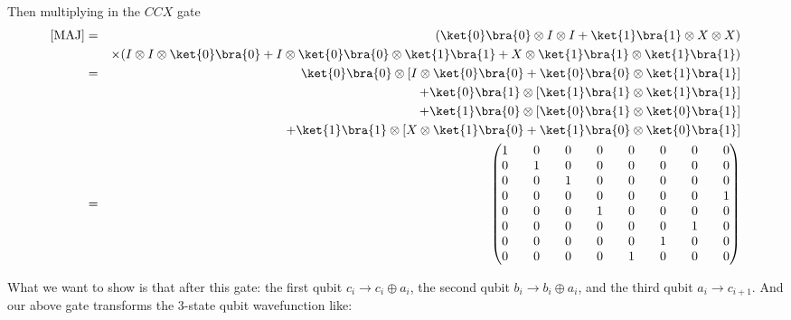 \documentclass[preprint,aps,prd,nofootinbib,superscriptaddress]{revtex4-2}
\begin{document}
Then multiplying in the $CCX$ gate
\begin{eqnarray}
\text{[MAJ]} &=& (\ket{0}\bra{0} \otimes I \otimes I + \ket{1}\bra{1} \otimes X \otimes X)
\nonumber \\
&& \times(I \otimes I \otimes \ket{0}\bra{0} + I \otimes \ket{0}\bra{0} \otimes \ket{1}\bra{1} + X \otimes \ket{1}\bra{1} \otimes \ket{1}\bra{1})
\nonumber \\
&=& \ket{0}\bra{0} \otimes \left[I \otimes \ket{0}\bra{0} + \ket{0}\bra{0} \otimes \ket{1}\bra{1}\right] 
\nonumber \\
&& + \ket{0}\bra{1} \otimes \left[\ket{1}\bra{1} \otimes \ket{1}\bra{1}\right]
\nonumber \\
&& + \ket{1}\bra{0} \otimes \left[\ket{0}\bra{1} \otimes \ket{0}\bra{1}\right]
\nonumber \\
&& + \ket{1}\bra{1} \otimes \left[X \otimes \ket{1}\bra{0} + \ket{1}\bra{0} \otimes \ket{0}\bra{1}\right]
\nonumber \\
&=& 
\begin{pmatrix}
1 \quad & 0 \quad & 0 \quad & 0 \quad & 0 \quad & 0 \quad & 0 \quad & 0 \\
0 \quad & 1 \quad & 0 \quad & 0 \quad & 0 \quad & 0 \quad & 0 \quad & 0 \\
0 \quad & 0 \quad & 1 \quad & 0 \quad & 0 \quad & 0 \quad & 0 \quad & 0 \\
0 \quad & 0 \quad & 0 \quad & 0 \quad & 0 \quad & 0 \quad & 0 \quad & 1 \\
0 \quad & 0 \quad & 0 \quad & 1 \quad & 0 \quad & 0 \quad & 0 \quad & 0 \\
0 \quad & 0 \quad & 0 \quad & 0 \quad & 0 \quad & 0 \quad & 1 \quad & 0 \\
0 \quad & 0 \quad & 0 \quad & 0 \quad & 0 \quad & 1 \quad & 0 \quad & 0 \\
0 \quad & 0 \quad & 0 \quad & 0 \quad & 1 \quad & 0 \quad & 0 \quad & 0
\end{pmatrix}
\end{eqnarray}

What we want to show is that after this gate: the first qubit $c_i\rightarrow c_i\oplus a_i$, the second qubit $b_i\rightarrow b_i\oplus a_i$, and the third qubit $a_i\rightarrow c_{i+1}$. And our above gate transforms the 3-state qubit wavefunction like:
\end{document}
